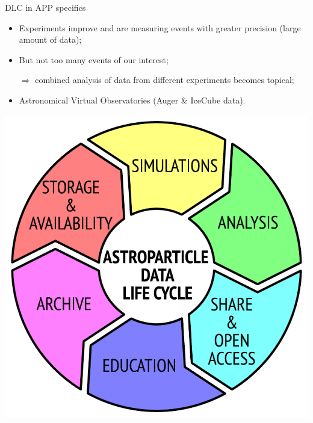 
\begin{frame}{DLC in APP specifics}
\begin{minipage}[c]{0.64\textwidth}
  \begin{itemize}
    \item Experiments improve and are measuring events with greater precision (large amount of data);
    \item But not too many events of our interest;
    \item[$\Rightarrow$] combined analysis of data from different experiments becomes topical;
    \item Astronomical Virtual Observatories (Auger \& IceCube data).
  \end{itemize}
\end{minipage}
\hfill
\begin{minipage}[c]{0.35\textwidth}
  \includegraphics[width=1\textwidth]{pics/ADLC.pdf}
\end{minipage}
\end{frame}

